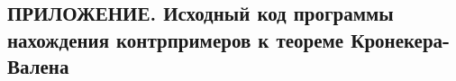 \documentclass[_00_dissertation.tex]{subfiles}
\begin{document}
\onlyinsubfile{
    \renewcommand{\contentsname}{ОГЛАВЛЕНИЕ}
    \setcounter{tocdepth}{3}
    \tableofcontents
}

\begin{center}
    \chapter*{ПРИЛОЖЕНИЕ. Исходный код программы нахождения контрпримеров к теореме Кронекера-Валена}\label{section:Appendix_code}
\end{center}



\onlyinsubfile{
    
    
}
\end{document}
